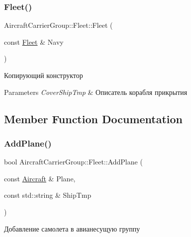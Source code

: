 \subsubsection{\texorpdfstring{Fleet()}{Fleet()}}
{\footnotesize\ttfamily Aircraft\+Carrier\+Group\+::\+Fleet\+::\+Fleet (\begin{DoxyParamCaption}\item[{const \mbox{\hyperlink{class_aircraft_carrier_group_1_1_fleet}{Fleet}} \&}]{Navy }\end{DoxyParamCaption})}



Копирующий конструктор 


\begin{DoxyParams}{Parameters}
{\em Cover\+Ship\+Tmp} & Описатель корабля прикрытия \\
\hline
\end{DoxyParams}


\subsection{Member Function Documentation}
\mbox{\label{class_aircraft_carrier_group_1_1_fleet_af7863ad9b057b0212b04019956254e8a}} 
\subsubsection{\texorpdfstring{Add\+Plane()}{AddPlane()}}
{\footnotesize\ttfamily bool Aircraft\+Carrier\+Group\+::\+Fleet\+::\+Add\+Plane (\begin{DoxyParamCaption}\item[{const \mbox{\hyperlink{class_aircraft_carrier_group_1_1_aircraft}{Aircraft}} \&}]{Plane,  }\item[{const std\+::string \&}]{Ship\+Tmp }\end{DoxyParamCaption})}



Добавление самолета в авианесущую группу 


